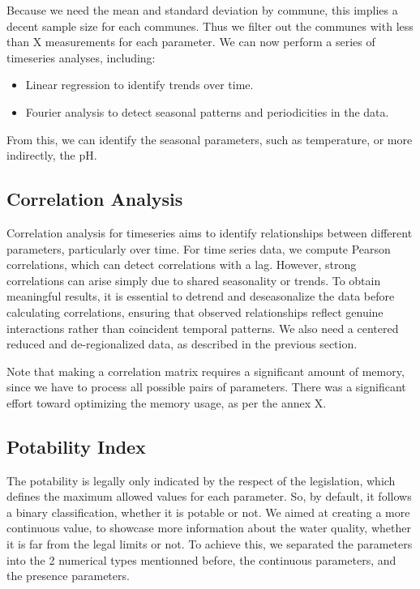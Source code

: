 \documentclass{article}
\begin{document}
Because we need the mean and standard deviation by commune, this implies a decent sample size for each communes.
Thus we filter out the communes with less than X measurements for each parameter.
We can now perform a series of timeseries analyses, including:
\begin{itemize}
    \item Linear regression to identify trends over time.
    \item Fourier analysis to detect seasonal patterns and periodicities in the data.
\end{itemize}

From this, we can identify the seasonal parameters, such as temperature, or more indirectly, the pH.

\subsection{Correlation Analysis}
Correlation analysis for timeseries aims to identify relationships between different parameters, 
particularly over time. For time series data, we compute Pearson correlations, which can detect correlations with a lag.
However, strong correlations can arise simply due to shared seasonality or trends. 
To obtain meaningful results, it is essential to detrend and deseasonalize 
the data before calculating correlations, ensuring that observed relationships 
reflect genuine interactions rather than coincident temporal patterns.
We also need a centered reduced and de-regionalized data, as described in the previous section.

Note that making a correlation matrix requires a significant amount of memory,
since we have to process all possible pairs of parameters.
There was a significant effort toward optimizing the memory usage, as per the annex X.

\subsection{Potability Index}
The potability is legally only indicated by the respect of the legislation, which defines the maximum allowed values for each parameter.
So, by default, it follows a binary classification, whether it is potable or not.
We aimed at creating a more continuous value, to showcase more information about the water quality, whether it is far from the legal limits or not.
To achieve this, we separated the parameters into the 2 numerical types mentionned before, the continuous parameters, and the presence parameters.
\end{document}
